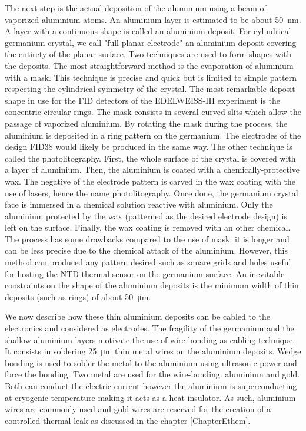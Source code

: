 The next step is the actual deposition of the aluminium using a beam of vaporized aluminium atoms. An aluminium layer is estimated to be about \SI{50}{\nano\m}. A layer with a continuous shape is called an aluminium deposit. For cylindrical germanium crystal, we call "full planar electrode" an aluminium deposit covering the entirety of the planar surface.
Two techniques are used to form shapes with the deposits.
The most straightforward method is the evaporation of aluminium with a mask. This technique is precise and quick but is limited to simple pattern respecting the cylindrical symmetry of the crystal. The most remarkable deposit shape in use for the FID detectors of the EDELWEISS-III experiment is the concentric circular rings. The mask  consists in several curved slits which allow the passage of vaporized aluminium. By rotating the mask during the process, the aluminium is deposited in a ring pattern on the germanium. The electrodes of the design FID38 would likely be produced in the same way.
The other technique is called the photolitography. First, the whole surface of the crystal is covered with a layer of aluminium. Then, the aluminium is coated with a chemically-protective wax. The negative of the electrode pattern is carved in the wax coating with the use of lasers, hence the name photolitography. Once done, the germanium crystal face is immersed in a chemical solution reactive with aluminium. Only the aluminium protected by the wax (patterned as the desired electrode design) is left on the surface. Finally, the wax coating is removed with an other chemical. The process has some drawbacks compared to the use of mask: it is longer and can be less precise due to the chemical attack of the aluminium. However, this method can produced any pattern desired such as  square grids and holes useful for hosting the NTD thermal sensor on the germanium surface.
An inevitable constraints on the shape of the aluminium deposits is the minimum width of thin deposits (such as rings) of about \SI{50}{\micro\m}.

We now describe how these thin aluminium deposits can be cabled to the electronics and considered as electrodes.
The fragility of the germanium and the shallow aluminium layers motivate the use of wire-bonding as cabling technique. It consists in soldering \SI{25}{\micro\meter} thin metal wires on the aluminium deposits. Wedge bonding is used to solder the metal to the aluminium using ultrasonic power and force the bonding. Two metal are used for the wire-bonding: aluminium and gold. Both can conduct the electric current however the aluminium is superconducting at cryogenic temperature making it acts as a heat insulator. As such, aluminium wires are commonly used and gold wires are reserved for the creation of a controlled thermal leak as discussed in the chapter \ref{ChapterEthem}.

